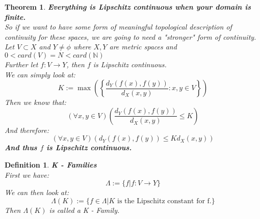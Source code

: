 \documentclass[12pt]{extarticle}
\theoremstyle{plain}
\newtheorem{thm}{Theorem}[section]
\theoremstyle{plain}
\theoremstyle{Definition}
\newtheorem{def.}{Definition}[section]
\theoremstyle{Definition}
\theoremstyle{plain}
\begin{document}
	\begin{thm} \textbf{Everything is Lipschitz continuous when your domain is finite.} \\
		So if we want to have some form of meaningful topological description of continuity for these spaces, we are going to need a "stronger" form of continuity. \\
		Let $V \subset X$ and $Y \not = \phi$ where $X,Y$ are metric spaces and $0 < card(V) = N < card(\mathbb{N})$ \\
		Further let $f : V \to Y$, then $f$ is Lipschitz continuous. \\
		We can simply look at: \\
		$$K := \max\left( \left\{\frac{d_Y(f(x),f(y))}{d_X(x,y)} : x,y \in V \right\} \right)$$
		Then we know that: 
		$$(\forall x,y \in V)\left( \frac{d_Y(f(x),f(y))}{d_X(x,y)} \leq K\right)$$
		And therefore: \\ 
		$$(\forall x,y \in V)\left( d_Y(f(x),f(y)) \leq Kd_X(x,y)\right)$$
		\textbf{And thus $f$ is Lipschitz continuous.} \\ 
	\end{thm}

	\begin{def.} \textbf{K - Families} \\ 
		First we have: \\ 
		$$\Lambda := \{f | f : V \to Y\}$$
		We can then look at: 
		$$\Lambda(K) := \{f \in \Lambda | K \text{ is the Lipschitz constant for f.}\}$$
		Then $\Lambda(K)$ is called a K - Family. 
	\end{def.}

	
	
\end{document}
